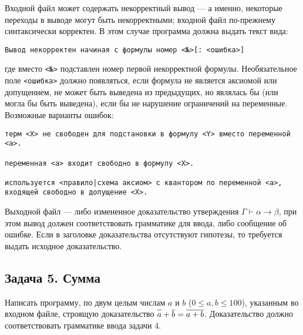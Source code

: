 \documentclass[11pt,a4paper,oneside]{article}
\begin{document}
Входной файл может содержать некорректный вывод --- а именно, некоторые переходы
в выводе могут быть некорректными; входной файл по-прежнему синтаксически корректен.
В этом случае программа должна выдать текст
вида: 
\begin{verbatim}
Вывод некорректен начиная с формулы номер <№>[: <ошибка>]
\end{verbatim}
где вместо \texttt{<№>} подставлен номер первой некорректной формулы. Необязательное поле
\texttt{<ошибка>} должно появляться, если формула не является аксиомой или допущением,
не может быть выведена из предыдущих, но являлась бы (или могла бы быть выведена), 
если бы не нарушение ограничений на переменные. Возможные варианты ошибок:
\begin{verbatim}
терм <X> не свободен для подстановки в формулу <Y> вместо переменной <a>.

переменная <a> входит свободно в формулу <X>.

используется <правило|схема аксиом> с квантором по переменной <a>, 
входящей свободно в допущение <X>.
\end{verbatim}

Выходной файл --- либо измененное доказательство утверждения $\Gamma \vdash \alpha \rightarrow \beta$,
при этом вывод должен соответствовать грамматике для ввода, либо сообщение об ошибке.
Если в заголовке доказательства отсутствуют гипотезы, то требуется выдать исходное доказательство.

\subsection*{Задача 5. Сумма}
Написать программу, по двум целым числам $a$ и $b$ ($0 \le a,b \le 100$), указанным во входном файле,
строящую доказательство $\overline{\vphantom{b}a} + \overline{b} = \overline{a+b}$. Доказательство должно 
соответствовать грамматике ввода задачи 4.
\end{document}
